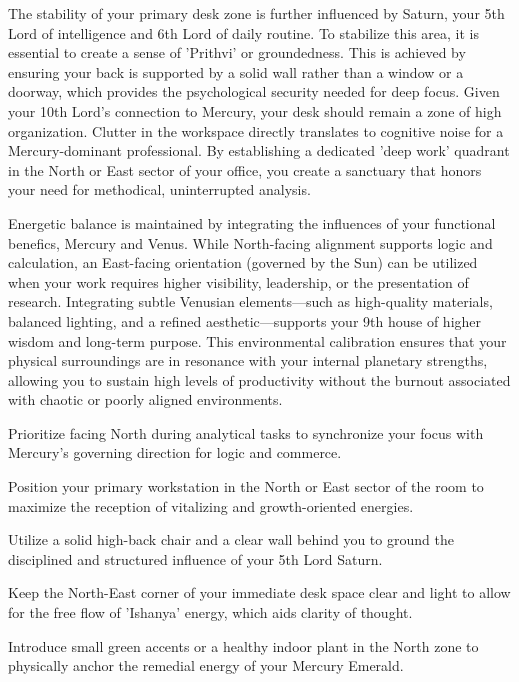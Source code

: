 {\fontsize{9}{13}\selectfont The stability of your primary desk zone is further influenced by Saturn, your 5th Lord of intelligence and 6th Lord of daily routine. To stabilize this area, it is essential to create a sense of 'Prithvi' or groundedness. This is achieved by ensuring your back is supported by a solid wall rather than a window or a doorway, which provides the psychological security needed for deep focus. Given your 10th Lord's connection to Mercury, your desk should remain a zone of high organization. Clutter in the workspace directly translates to cognitive noise for a Mercury-dominant professional. By establishing a dedicated 'deep work' quadrant in the North or East sector of your office, you create a sanctuary that honors your need for methodical, uninterrupted analysis.}\par\vspace{1.8mm}

{\fontsize{9}{13}\selectfont Energetic balance is maintained by integrating the influences of your functional benefics, Mercury and Venus. While North-facing alignment supports logic and calculation, an East-facing orientation (governed by the Sun) can be utilized when your work requires higher visibility, leadership, or the presentation of research. Integrating subtle Venusian elements---such as high-quality materials, balanced lighting, and a refined aesthetic---supports your 9th house of higher wisdom and long-term purpose. This environmental calibration ensures that your physical surroundings are in resonance with your internal planetary strengths, allowing you to sustain high levels of productivity without the burnout associated with chaotic or poorly aligned environments.}\par\vspace{1.8mm}

\begin{diamondlist}
  \item {\fontsize{8.5}{12}\selectfont Prioritize facing North during analytical tasks to synchronize your focus with Mercury's governing direction for logic and commerce.}
  \item {\fontsize{8.5}{12}\selectfont Position your primary workstation in the North or East sector of the room to maximize the reception of vitalizing and growth-oriented energies.}
  \item {\fontsize{8.5}{12}\selectfont Utilize a solid high-back chair and a clear wall behind you to ground the disciplined and structured influence of your 5th Lord Saturn.}
  \item {\fontsize{8.5}{12}\selectfont Keep the North-East corner of your immediate desk space clear and light to allow for the free flow of 'Ishanya' energy, which aids clarity of thought.}
  \item {\fontsize{8.5}{12}\selectfont Introduce small green accents or a healthy indoor plant in the North zone to physically anchor the remedial energy of your Mercury Emerald.}
\end{diamondlist}

